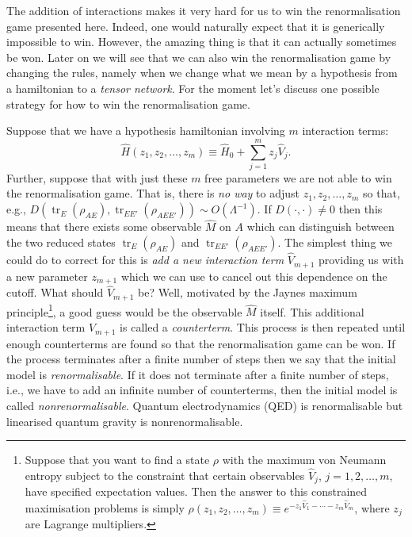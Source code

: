 \documentclass[11pt]{amsart}
\DeclareMathOperator{\tr}{tr}
\theoremstyle{plain}%
\theoremstyle{definition}
\theoremstyle{remark}
\begin{document}
The addition of interactions makes it very hard for us to win the renormalisation game presented here. Indeed, one would naturally expect that it is generically impossible to win. However, the amazing thing is that it can actually sometimes be won.  Later on we will see that we can also win the renormalisation game by changing the rules, namely when we change what we mean by a hypothesis from a hamiltonian to a \emph{tensor network}. For the moment let's discuss one possible strategy for how to win the renormalisation game. 

Suppose that we have a hypothesis hamiltonian involving $m$ interaction terms:
\begin{equation}
	\widehat{H}(z_1,z_2, \ldots, z_m) \equiv \widehat{H}_0 + \sum_{j=1}^m z_j \widehat{V}_j.
\end{equation} 
Further, suppose that with just these $m$ free parameters we are not able to win the renormalisation game. That is, there is \emph{no way} to adjust $z_1, z_2, \ldots, z_m$ so that, e.g., $D(\tr_{E}(\rho_{AE}), \tr_{EE'}(\rho_{AEE'})) \sim O(\Lambda^{-1})$. If $D(\cdot, \cdot) \not= 0$ then this means that there exists  some observable $\widehat{M}$ on $A$ which can distinguish between the two reduced states $\tr_{E}(\rho_{AE})$ and $\tr_{EE'}(\rho_{AEE'})$. The simplest thing we could do to correct for this is \emph{add a new interaction term} $\widehat{V}_{m+1}$ providing us with a new parameter $z_{m+1}$ which we can use to cancel out this dependence on the cutoff. What should $\widehat{V}_{m+1}$ be? Well, motivated by the Jaynes maximum principle\footnote{Suppose that you want to find a state $\rho$ with the maximum von Neumann entropy subject to the constraint that certain observables $\widehat{V}_j$, $j = 1, 2, \ldots, m$, have specified expectation values. Then the answer to this constrained maximisation problems is simply $\rho(z_1, z_2, \ldots, z_m) \equiv e^{-z_1 \widehat{V}_1 - \cdots -z_m\widehat{V}_m}$, where $z_j$ are Lagrange multipliers.}, a good guess would be the observable $\widehat{M}$ itself. This additional interaction term $\widehat{V}_{m+1}$ is called a \emph{counterterm}. This process is then repeated until enough counterterms are found so that the renormalisation game can be won. If the process terminates after a finite number of steps then we say that the initial model is \emph{renormalisable}. If it does not terminate after a finite number of steps, i.e., we have to add an infinite number of counterterms, then the initial model is called \emph{nonrenormalisable}. Quantum electrodynamics (QED) is renormalisable but linearised quantum gravity is nonrenormalisable. 
\end{document}
